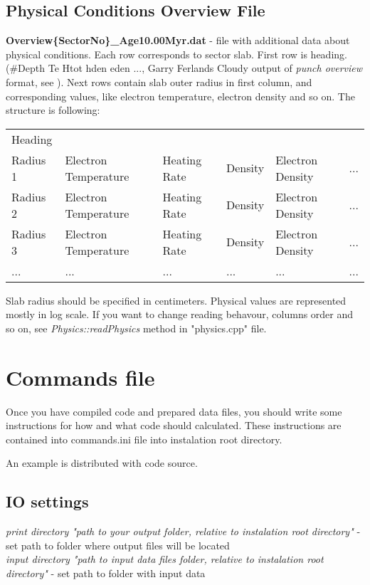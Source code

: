 \documentclass[a4paper]{article}
\begin{document}
\subsection{Physical Conditions Overview File}
\label{dataOverview}
{\bf Overview\{SectorNo\}\_Age10.00Myr.dat} - file with additional data about physical conditions. Each row
corresponds to sector slab. First row is heading.
(\#Depth		Te	Htot hden eden ..., Garry Ferlands Cloudy output of {\it punch overview}
format, see \cite{Cloudy}).
Next rows contain slab outer radius in first column,
and corresponding values, like electron temperature, electron density and so on.
The structure is following:
\begin{table}[H]
    \begin{tabular}{llllll}
        Heading & & & & & \\
        Radius 1 & Electron Temperature & Heating Rate & Density & Electron Density & ... \\
        Radius 2 & Electron Temperature & Heating Rate & Density & Electron Density & ... \\
        Radius 3 & Electron Temperature & Heating Rate & Density & Electron Density & ... \\
        ... & ... & ... & ... & ... & ... \\
    \end{tabular}
\end{table}
Slab radius should be specified in centimeters. Physical values are represented mostly in log scale.
If you want to change reading behavour, columns order and so on, see {\it Physics::readPhysics} method in "physics.cpp" file.


\section{Commands file}

Once you have compiled code and prepared data files, you should write some 
instructions for how and what code should calculated. These instructions are 
contained into commands.ini file into instalation root directory. 

An example is distributed with code source. \\

\subsection{IO settings}
{\it print directory "path to your output folder, relative to instalation root directory"} - set path to folder where output files will be located\\
{\it input directory "path to input data files folder, relative to instalation root directory"} - set path to folder with input data\\
\end{document}

